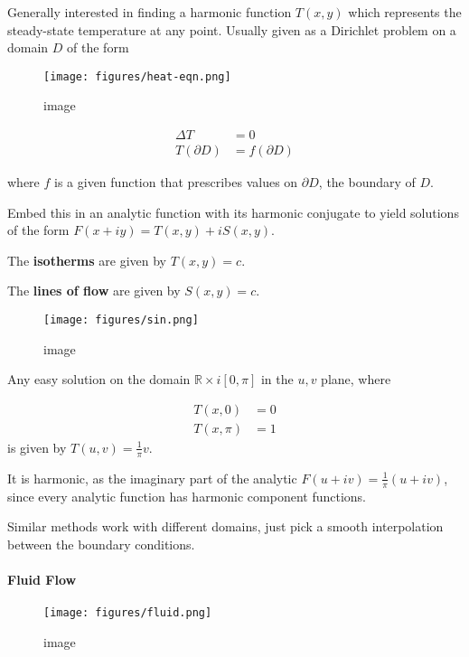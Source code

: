 Generally interested in finding a harmonic function \(T(x,y)\) which
represents the steady-state temperature at any point. Usually given as a
Dirichlet problem on a domain \(D\) of the form

\begin{figure}
\centering
\texttt{[image: figures/heat-eqn.png]}
\caption{image}
\end{figure}

\begin{align*}
\Delta T &= 0 \\
T(\partial D) &= f(\partial D)
\end{align*}

where \(f\) is a given function that prescribes values on
\(\partial D\), the boundary of \(D\).

Embed this in an analytic function with its harmonic conjugate to yield
solutions of the form \(F(x+iy) = T(x,y) + iS(x,y)\).

The \textbf{isotherms} are given by \(T(x,y) = c\).

The \textbf{lines of flow} are given by \(S(x,y) = c\).

\begin{figure}
\centering
\texttt{[image: figures/sin.png]}
\caption{image}
\end{figure}

Any easy solution on the domain \(\mathbb{R} \times i[0,\pi]\) in the
\(u,v\) plane, where

\begin{align*}
T(x, 0) &= 0 \\
T(x, \pi) &= 1 
\end{align*} is given by \(T(u,v) = \frac{1}{\pi}v\).

It is harmonic, as the imaginary part of the analytic
\(F(u+iv) = \frac{1}{\pi}(u+iv)\), since every analytic function has
harmonic component functions.

Similar methods work with different domains, just pick a smooth
interpolation between the boundary conditions.

\hypertarget{fluid-flow}{%
\paragraph{Fluid Flow}\label{fluid-flow}}

\begin{figure}
\centering
\texttt{[image: figures/fluid.png]}
\caption{image}
\end{figure}

